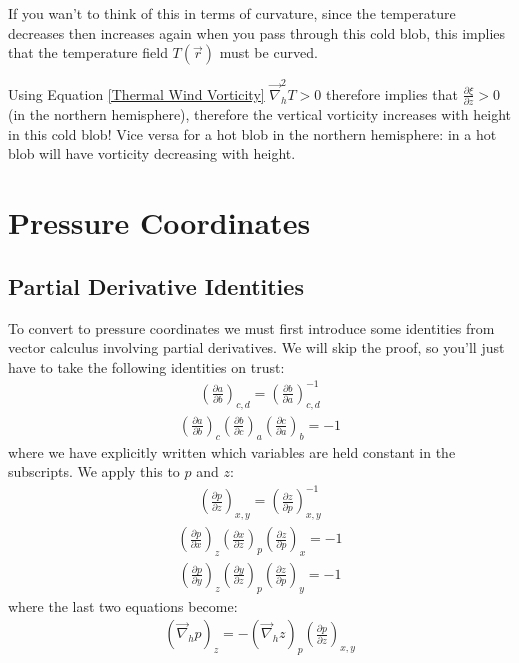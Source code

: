 If you wan't to think of this in terms of curvature, since the temperature decreases then increases again when you pass through this cold blob, this implies that the temperature field $T(\vec{r})$ must be curved.  

Using Equation \ref{Thermal Wind Vorticity} $\vec{\nabla}_h^2 T>0$ therefore implies that $\frac{\partial \xi}{\partial z}>0$ (in the northern hemisphere), therefore the vertical vorticity increases with height in this cold blob! Vice versa for a hot blob in the northern hemisphere: in a hot blob will have vorticity decreasing with height. 

\section{Pressure Coordinates}\label{Pressure Coords}
\subsection{Partial Derivative Identities}

To convert to pressure coordinates we must first introduce some identities from vector calculus involving partial derivatives. We will skip the proof, so you'll just have to take the following identities on trust:
\begin{align*}
    \left(\frac{\partial a}{\partial b}\right)_{c,d}=\left(\frac{\partial b}{\partial a}\right)_{c,d}^{-1}
\end{align*}
\begin{align*}
    \left(\frac{\partial a}{\partial b}\right)_c
    \left(\frac{\partial b}{\partial c}\right)_a
    \left(\frac{\partial c}{\partial a}\right)_b
    =-1
\end{align*}
where we have explicitly written which variables are held constant in the subscripts. We apply this to $p$ and $z$:
\begin{align}
    \label{P inverse}
    \left(\frac{\partial p}{\partial z}\right)_{x,y}=\left(\frac{\partial z}{\partial p}\right)_{x,y}^{-1}
\end{align}
\begin{align*}
    \left(\frac{\partial p}{\partial x}\right)_z
    \left(\frac{\partial x}{\partial z}\right)_p
    \left(\frac{\partial z}{\partial p}\right)_x
    =-1
\end{align*}
\begin{align*}
    \left(\frac{\partial p}{\partial y}\right)_z
    \left(\frac{\partial y}{\partial z}\right)_p
    \left(\frac{\partial z}{\partial p}\right)_y
    =-1
\end{align*}
where the last two equations become:
\begin{align}
    \label{P -1}
    \left(\vec{\nabla}_h p\right)_z=-\left(\vec{\nabla}_h z\right)_p\left(\frac{\partial p}{\partial z}\right)_{x,y}
\end{align}


